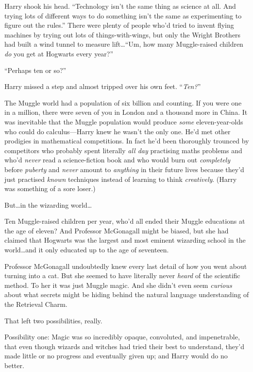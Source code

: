 Harry shook his head. “Technology isn’t the same thing as science at all. And trying lots of different ways to do something isn’t the same as experimenting to figure out the rules.” There were plenty of people who’d tried to invent flying machines by trying out lots of things-with-wings, but only the Wright Brothers had built a wind tunnel to measure lift…“Um, how many Muggle-raised children \emph{do} you get at Hogwarts every year?”

“Perhaps ten or so?”

Harry missed a step and almost tripped over his own feet. “\emph{Ten?}”

The Muggle world had a population of six billion and counting. If you were one in a million, there were seven of you in London and a thousand more in China. It was inevitable that the Muggle population would produce \emph{some} eleven-year-olds who could do calculus—Harry knew he wasn’t the only one. He’d met other prodigies in mathematical competitions. In fact he’d been thoroughly trounced by competitors who probably spent literally \emph{all day} practising maths problems and who’d \emph{never} read a science-fiction book and who would burn out \emph{completely} before \emph{puberty} and \emph{never} amount to \emph{anything} in their future lives because they’d just practised \emph{known} techniques instead of learning to think \emph{creatively}. (Harry was something of a sore loser.)

But…in the wizarding world…

Ten Muggle-raised children per year, who’d all ended their Muggle educations at the age of eleven? And Professor McGonagall might be biased, but she had claimed that Hogwarts was the largest and most eminent wizarding school in the world…and it only educated up to the age of seventeen.

Professor McGonagall undoubtedly knew every last detail of how you went about turning into a cat. But she seemed to have literally never \emph{heard} of the scientific method. To her it was just Muggle magic. And she didn’t even seem \emph{curious} about what secrets might be hiding behind the natural language understanding of the Retrieval Charm.

That left two possibilities, really.

Possibility one: Magic was so incredibly opaque, convoluted, and impenetrable, that even though wizards and witches had tried their best to understand, they’d made little or no progress and eventually given up; and Harry would do no better.

